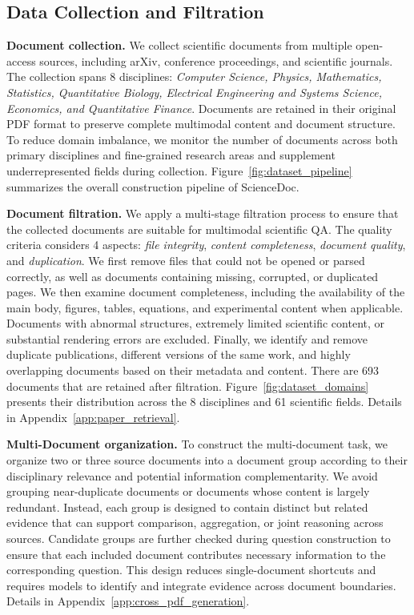 \documentclass{article} %
\begin{document}
\subsection{Data Collection and Filtration}

\textbf{Document collection.} We collect scientific documents from multiple open-access sources, including arXiv, conference proceedings, and scientific journals. The collection spans 8 disciplines: \textit{Computer Science, Physics, Mathematics, Statistics, Quantitative Biology, Electrical Engineering and Systems Science, Economics, and Quantitative Finance}. Documents are retained in their original PDF format to preserve complete multimodal content and document structure. To reduce domain imbalance, we monitor the number of documents across both primary disciplines and fine-grained research areas and supplement underrepresented fields during collection. Figure~\ref{fig:dataset_pipeline} summarizes the overall construction pipeline of ScienceDoc.

\textbf{Document filtration.} We apply a multi-stage filtration process to ensure that the collected documents are suitable for multimodal scientific QA. The quality criteria considers 4 aspects: \textit{file integrity}, \textit{content completeness}, \textit{document quality}, and \textit{duplication}. We first remove files that could not be opened or parsed correctly, as well as documents containing missing, corrupted, or duplicated pages. We then examine document completeness, including the availability of the main body, figures, tables, equations, and experimental content when applicable. Documents with abnormal structures, extremely limited scientific content, or substantial rendering errors are excluded. Finally, we identify and remove duplicate publications, different versions of the same work, and highly overlapping documents based on their metadata and content. There are 693 documents that are retained after filtration. Figure~\ref{fig:dataset_domains} presents their distribution across the 8 disciplines and 61 scientific fields. Details in Appendix~\ref{app:paper_retrieval}.

\textbf{Multi-Document organization.} To construct the multi-document task, we organize two or three source documents into a document group according to their disciplinary relevance and potential information complementarity. We avoid grouping near-duplicate documents or documents whose content is largely redundant. Instead, each group is designed to contain distinct but related evidence that can support comparison, aggregation, or joint reasoning across sources. Candidate groups are further checked during question construction to ensure that each included document contributes necessary information to the corresponding question. This design reduces single-document shortcuts and requires models to identify and integrate evidence across document boundaries. Details in Appendix~\ref{app:cross_pdf_generation}.
\end{document}
